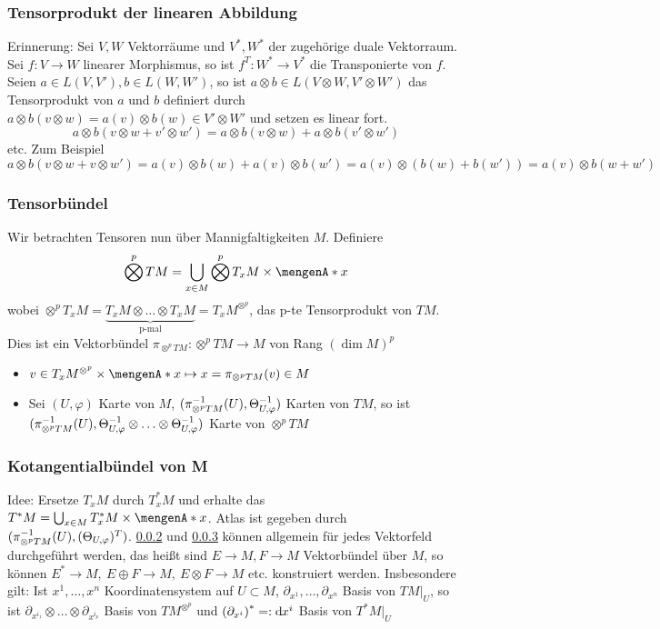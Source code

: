 \subsubsection{Tensorprodukt der linearen Abbildung}
\label{ssub:172}
Erinnerung: Sei $V, W$ Vektorräume und $V^*,W^*$ der zugehörige duale Vektorraum. Sei $f:V\to W$ linearer Morphismus, so ist $f^T: W^*\to V^*$ die Transponierte von $f$. Seien $a\in L(V,V'), b\in L(W,W')$, so ist $a\otimes b \in L(V\otimes W,V'\otimes W')$ das Tensorprodukt von $a$ und $b$ definiert durch $a\otimes b (v\otimes w) = a(v)\otimes b(w)\in V'\otimes W'$ und setzen es linear fort.
\[
a\otimes b (v\otimes w +v'\otimes w') = a\otimes b(v\otimes w) + a\otimes b(v'\otimes w')
\]
etc. Zum Beispiel
\[
a\otimes b (v\otimes w +v\otimes w') = a(v)\otimes b(w) + a(v)\otimes b(w') = a(v)\otimes (b(w)+b(w')) = a(v)\otimes b(w+w')
\]

\subsubsection{Tensorbündel}
\label{ssub:173}
Wir betrachten Tensoren nun über Mannigfaltigkeiten $M$. Definiere
\[
\bigotimes^p TM = \bigcup_{x\in M} \bigotimes^p T_x M\times \set{x}
\]
wobei $\otimes^p T_x M = \underbrace{T_x M \otimes \ldots \otimes T_x M}_{\text{p-mal}} = T_x M^{\otimes^p}$, das p-te Tensorprodukt von $TM$. Dies ist ein Vektorbündel $\pi_{\otimes^p TM}: \otimes^p TM\to M$ von Rang $(\dim M)^p$
\begin{itemize}
\item $v\in T_x M^{\otimes^p}\times \set{x} \mapsto x = \pi_{\otimes^p TM}(v) \in M$
\item Sei $(U,\varphi)$ Karte von $M$, $\enbrace{\pi_{\otimes^p TM}^{-1}(U), \Theta_{U,\varphi}^{-1}}$ Karten von $TM$, so ist $\enbrace{\pi_{\otimes^p TM}^{-1}(U), \Theta^{-1}_{U,\varphi}\otimes \ldots \otimes \Theta^{-1}_{U,\varphi}}$ Karte von $\otimes^p TM$
\end{itemize} 

\subsubsection{Kotangentialbündel von M}
\label{ssub:174}
Idee: Ersetze $T_x M$ durch $T_x^* M$ und erhalte das  $T^* M = \bigcup_{x\in M} T_x^* M \times \set{x}$. Atlas ist gegeben durch $\enbrace{\pi_{\otimes^p TM}^{-1}(U), \enbrace{\Theta_{U,\varphi}}^{T}}$. \ref{ssub:173} und \ref{ssub:174} können allgemein für jedes Vektorfeld durchgeführt werden, das heißt sind $E\to M, F\to M$ Vektorbündel über $M$, so können $E^*\to M,\ E\oplus F\to M,\ E\otimes F\to M$ etc. konstruiert werden.
Insbesondere gilt: Ist $x^1,\ldots,x^n$ Koordinatensystem auf $U\subset M$, $\partial_{x^1},\ldots, \partial_{x^n}$ Basis von $TM\vert_U$, so ist $\partial_{x^{i_1}}\otimes \ldots \otimes \partial_{x^{i_p}}$ Basis von $TM^{\otimes^p}$ und $\enbrace*{\partial_{x^i}}^* =: \mathd x^i$ Basis von $T^* M\vert_U$

